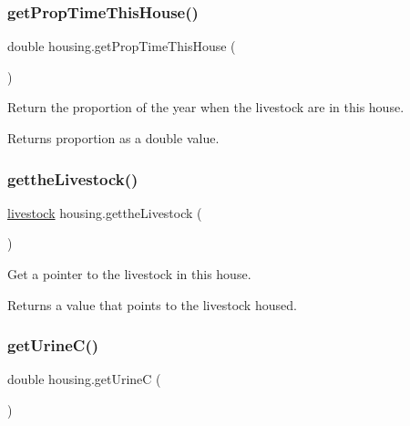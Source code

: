 \subsubsection{\texorpdfstring{getPropTimeThisHouse()}{getPropTimeThisHouse()}}
{\footnotesize\ttfamily double housing.\+get\+Prop\+Time\+This\+House (\begin{DoxyParamCaption}{ }\end{DoxyParamCaption})\hspace{0.3cm}{\ttfamily [inline]}}



Return the proportion of the year when the livestock are in this house. 

\begin{DoxyReturn}{Returns}
proportion as a double value. 
\end{DoxyReturn}
\mbox{\label{classhousing_ac8e88d4ccf32bc6f9a4fad60a35cd0ae}} 
\subsubsection{\texorpdfstring{gettheLivestock()}{gettheLivestock()}}
{\footnotesize\ttfamily \mbox{\hyperlink{classlivestock}{livestock}} housing.\+getthe\+Livestock (\begin{DoxyParamCaption}{ }\end{DoxyParamCaption})\hspace{0.3cm}{\ttfamily [inline]}}



Get a pointer to the livestock in this house. 

\begin{DoxyReturn}{Returns}
a value that points to the livestock housed. 
\end{DoxyReturn}
\mbox{\label{classhousing_a03f1a9f603529c9110bb7847bcddcd48}} 
\subsubsection{\texorpdfstring{getUrineC()}{getUrineC()}}
{\footnotesize\ttfamily double housing.\+get\+UrineC (\begin{DoxyParamCaption}{ }\end{DoxyParamCaption})\hspace{0.3cm}{\ttfamily [inline]}}



